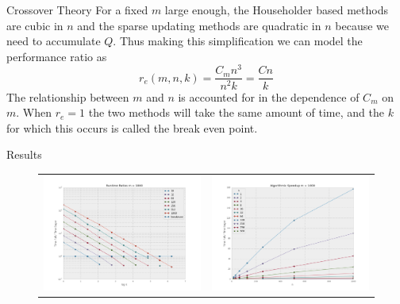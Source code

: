\documentclass{beamer}
\begin{document}
\begin{frame}{Crossover Theory} 
For a fixed $m$ large enough, the Householder based methods are cubic in $n$ and the sparse updating methods are quadratic in $n$ because we need to accumulate $Q$. 
Thus making this simplification we can model the performance ratio as
\begin{equation}\label{eqn:model}
    r_e(m,n,k) = \frac{C_m n^3}{n^2k} = \frac{Cn}{k}
\end{equation}
The relationship between $m$ and $n$ is accounted for in the dependence of $C_m$ on $m$.
When $r_e=1$ the two methods will take the same amount of time, and the $k$ for which this occurs is called the break even point.
\end{frame}

\begin{frame}{Results}
\newcommand{\plotwidth}{2.2in} %
\begin{figure}
\begin{tabular}{cc}
\includegraphics[width=\plotwidth]{tratio1000.png} & \includegraphics[width=\plotwidth]{tratioarc1000.png}\\

\end{tabular}
\end{figure}
\end{frame}
\end{document}
